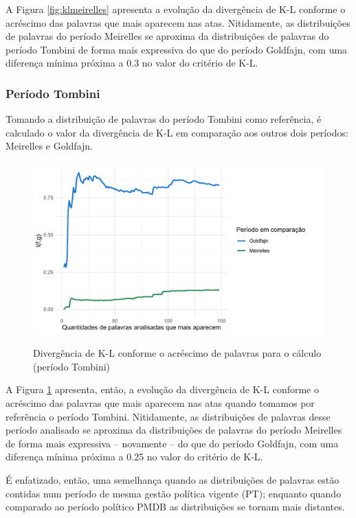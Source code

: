 A Figura \ref{fig:klmeirelles} apresenta a evolução da divergência de K-L conforme o acréscimo das palavras que mais aparecem nas atas. Nitidamente, as distribuições de palavras do período Meirelles se aproxima da distribuições de palavras do período Tombini de forma mais expressiva do que do período Goldfajn, com uma diferença mínima próxima a 0.3 no valor do critério de K-L.

\subsubsection*{Período Tombini}

Tomando a distribuição de palavras do período Tombini como referência, é calculado o valor da divergência de K-L em comparação aos outros dois períodos: Meirelles e Goldfajn.

\begin{figure}[!h]
    \centering
    \caption{Divergência de K-L conforme o acréscimo de palavras para o cálculo (período Tombini)}
    \includegraphics[width=\textwidth]{capitulos/figures/kltombini.pdf}
    \label{fig:kltombini}
\end{figure}

A Figura \ref{fig:kltombini} apresenta, então, a evolução da divergência de K-L conforme o acréscimo das palavras que mais aparecem nas atas quando tomamos por referência o período Tombini. Nitidamente, as distribuições de palavras desse período analisado se aproxima da distribuições de palavras do período Meirelles de forma mais expressiva -- novamente -- do que do período Goldfajn, com uma diferença mínima próxima a 0.25 no valor do critério de K-L.

É enfatizado, então, uma semelhança quando as distribuições de palavras estão contidas num período de mesma gestão política vigente (PT); enquanto quando comparado ao período político PMDB as distribuições se tornam mais distantes.


